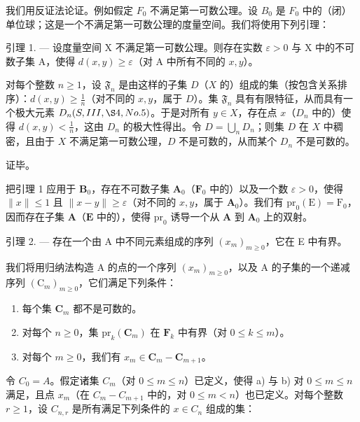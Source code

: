 我们用反证法论证。例如假定 \(F_{0}\) 不满足第一可数公理。设 \(B_{0}\) 是 \(F_{0}\) 中的（闭）单位球；这是一个不满足第一可数公理的度量空间。我们将使用下列引理：

引理 1. --- 设度量空间 X 不满足第一可数公理。则存在实数 \(\varepsilon > 0\) 与 X 中的不可数子集 A，使得 \(d(x, y) \geqslant \varepsilon\)（对 A 中所有不同的 \(x, y\)）。

对每个整数 \(n \geqslant 1\)，设 \(\mathfrak{F}_n\) 是由这样的子集 \(D\)（\(X\) 的）组成的集（按包含关系排序）：\(d(x, y) \geqslant \frac{1}{n}\)（对不同的 \(x, y\)，属于 \(D\)）。集 \(\mathfrak{F}_n\) 具有有限特征，从而具有一个极大元素 \(D_n(S, III, \S 4, No. 5)\)。于是对所有 \(y \in X\)，存在点 \(x\)（\(D_n\) 中的）使得 \(d(x, y) < \frac{1}{n}\)，这由 \(D_n\) 的极大性得出。令 \(D = \bigcup_{n} D_n\)；则集 \(D\) 在 \(X\) 中稠密，且由于 \(X\) 不满足第一可数公理，\(D\) 不是可数的，从而某个 \(D_n\) 不是可数的。

证毕。

把引理 1 应用于 \(\mathbf{B}_0\)，存在不可数子集 \(\mathbf{A}_0\)（\(\mathbf{F}_0\) 中的）以及一个数 \(\varepsilon > 0\)，使得 \(\| x \| \leqslant 1\) 且 \(\| x - y \| \geqslant \varepsilon\)（对不同的 \(x, y\)，属于 \(\mathbf{A}_0\)）。我们有 \(\mathrm{pr}_0(\mathrm{E}) = \mathrm{F}_0\)，因而存在子集 \(\mathbf{A}\)（\(\mathbf{E}\) 中的），使得 \(\mathrm{pr}_0\) 诱导一个从 \(\mathbf{A}\) 到 \(\mathbf{A}_0\) 上的双射。

引理 2. --- 存在一个由 A 中不同元素组成的序列 \((x_{m})_{m\geqslant 0}\)，它在 E 中有界。

我们将用归纳法构造 A 的点的一个序列 \((x_{m})_{m\geqslant 0}\)，以及 A 的子集的一个递减序列 \((\mathrm{C}_m)_{m\geqslant 0}\)，它们满足下列条件：

\begin{enumerate}
\def\labelenumi{\alph{enumi})}
\item
  每个集 \(\mathbf{C}_m\) 都不是可数的。
\item
  对每个 \(n \geqslant 0\)，集 \(\mathrm{pr}_k(\mathbf{C}_m)\) 在 \(\mathbf{F}_k\) 中有界（对 \(0 \leqslant k \leqslant m\)）。
\item
  对每个 \(m \geqslant 0\)，我们有 \(x_{m} \in \mathbf{C}_{m} - \mathbf{C}_{m+1}\)。
\end{enumerate}

令 \(C_0 = A\)。假定诸集 \(C_m\)（对 \(0 \leqslant m \leqslant n\)）已定义，使得 a) 与 b) 对 \(0 \leqslant m \leqslant n\) 满足，且点 \(x_m\)（在 \(C_m - C_{m+1}\) 中的，对 \(0 \leqslant m < n\)）也已定义。对每个整数 \(r \geqslant 1\)，设 \(C_{n,r}\) 是所有满足下列条件的 \(x \in C_n\) 组成的集：

